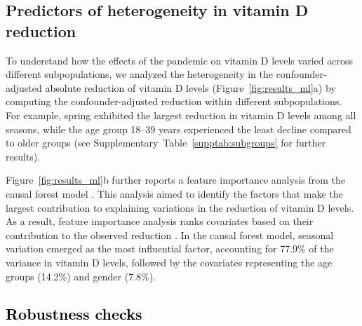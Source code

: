 \documentclass[12pt]{article}
\newcommand{\REV}[1]{\textcolor{black}{#1}}
\begin{document}
\subsection*{Predictors of heterogeneity in vitamin D reduction}

To understand how the effects of the pandemic on vitamin D levels varied across different subpopulations, we analyzed the heterogeneity in the confounder-adjusted \REV{absolute} reduction of vitamin D levels (Figure~\ref{fig:results_ml}a) by computing the confounder-adjusted reduction within different subpopulations. For example, spring exhibited the largest reduction in vitamin D levels among all seasons, while the age group 18--39 years experienced the least decline compared to older groups (see Supplementary~Table~\ref{supptab:subgroups} for further results).

Figure~\ref{fig:results_ml}b further reports a feature importance analysis from the causal forest model \cite{Grömping2009}. This analysis aimed to identify the factors that make the largest contribution to explaining variations in the reduction of vitamin D levels. As a result, feature importance analysis ranks covariates based on their contribution to the observed reduction \cite{Athey2019}. In the causal forest model, seasonal variation emerged as the most influential factor, accounting for 77.9\% of the variance in vitamin D levels, followed by the covariates representing the age groups (14.2\%) and gender (7.8\%).



\subsection*{\REV{Robustness checks}}
\end{document}
